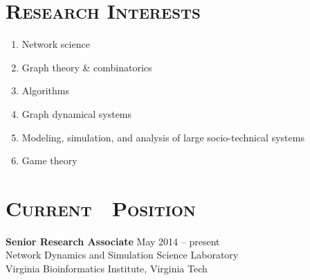 \documentclass[margin,10pt]{res} %
\begin{document}
\begin{resume}
\section{\textnormal{\textsc{Research Interests}}}
\vspace{-.4mm}
\begin{multicols}{2}
\begin{enumerate}[$\circ$]
\item Network science
\item Graph theory \& combinatorics
\item Algorithms
\item Graph dynamical systems
\item Modeling, simulation, and analysis of large socio-technical systems
\item Game theory
\end{enumerate}
\end{multicols}
\section{\textnormal{\textsc{Current\,\,\,\, Position}}}
\textbf{Senior Research Associate} \hfill May 2014 -- present\\
Network Dynamics and Simulation Science Laboratory\\
Virginia Bioinformatics Institute, Virginia Tech

\end{resume}
\end{document}
